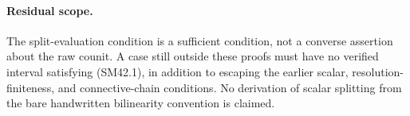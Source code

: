 \paragraph{Residual scope.}
The split-evaluation condition is a sufficient condition,
not a converse assertion about the raw counit.  A case
still outside these proofs must have no verified interval
satisfying (SM42.1), in addition to escaping the earlier
scalar, resolution-finiteness, and connective-chain
conditions.  No derivation of scalar splitting from the
bare handwritten bilinearity convention is claimed.
